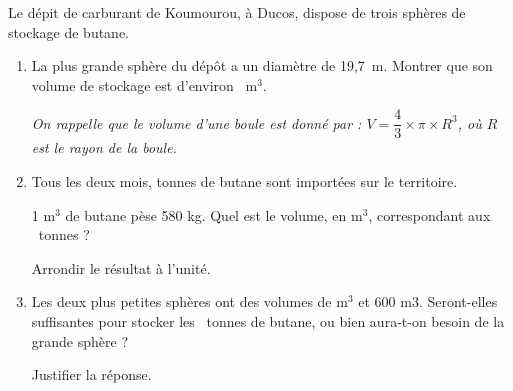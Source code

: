 
\medskip

Le dépit de carburant de Koumourou, à  Ducos, dispose de trois sphères de stockage de butane.

\medskip

\begin{enumerate}
\item La plus grande sphère du dépôt a un diamètre de 19,7~m. Montrer que son volume de stockage est d'environ ~m$^{3}$.

\emph{On rappelle que le volume d'une boule est donné par : $V = \dfrac{4}{3} \times \pi \times R^3$, où $R$ est le rayon de la boule.} 
\item Tous les deux mois,  tonnes de butane sont importées sur le territoire. 

1 m$^3$ de butane pèse 580 kg. Quel est le volume, en m$^3$, correspondant aux ~tonnes ? 

Arrondir le résultat à l'unité. 
\item  Les deux plus petites sphères ont des volumes de  m$^3$ et 600 m$3$. Seront-elles suffisantes pour stocker les ~tonnes de butane, ou bien aura-t-on besoin de la grande sphère ?

Justifier la réponse. 
\end{enumerate}


